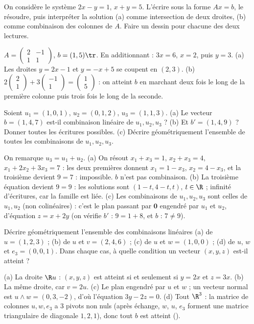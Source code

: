 \begin{exo}
On considère le système $2x-y=1$, $x+y=5$. L'écrire sous la forme $Ax=b$, le résoudre, puis interpréter la solution (a) comme intersection de deux droites, (b) comme combinaison des colonnes de $A$. Faire un dessin pour chacune des deux lectures.
\begin{corrige}
$A=\begin{pmatrix}2&-1\\1&1\end{pmatrix}$, $b=(1,5)\tr$. En additionnant : $3x=6$, $x=2$, puis $y=3$. (a) Les droites $y=2x-1$ et $y=-x+5$ se coupent en $(2,3)$. (b) $2\begin{pmatrix}2\\1\end{pmatrix}+3\begin{pmatrix}-1\\1\end{pmatrix}=\begin{pmatrix}1\\5\end{pmatrix}$ : on atteint $b$ en marchant deux fois le long de la première colonne puis trois fois le long de la seconde.
\end{corrige}
\end{exo}
\begin{exo}
Soient $u_1=(1,0,1)$, $u_2=(0,1,2)$, $u_3=(1,1,3)$. (a) Le vecteur $b=(1,4,7)$ est-il combinaison linéaire de $u_1,u_2,u_3$ ? (b) Et $b'=(1,4,9)$ ? Donner toutes les écritures possibles. (c) Décrire géométriquement l'ensemble de toutes les combinaisons de $u_1,u_2,u_3$.
\begin{corrige}
On remarque $u_3=u_1+u_2$. (a) On résout $x_1+x_3=1$, $x_2+x_3=4$, $x_1+2x_2+3x_3=7$ : les deux premières donnent $x_1=1-x_3$, $x_2=4-x_3$, et la troisième devient $9=7$ : impossible. $b$ n'est pas combinaison. (b) La troisième équation devient $9=9$ : les solutions sont $(1-t,4-t,t)$, $t\in\R$ ; infinité d'écritures, car la famille est liée. (c) Les combinaisons de $u_1,u_2,u_3$ sont celles de $u_1,u_2$ (non colinéaires) : c'est le plan passant par $\mathbf 0$ engendré par $u_1$ et $u_2$, d'équation $z=x+2y$ (on vérifie $b'$ : $9=1+8$, et $b$ : $7\neq9$).
\end{corrige}
\end{exo}
\begin{exo}
Décrire géométriquement l'ensemble des combinaisons linéaires (a) de $u=(1,2,3)$ ; (b) de $u$ et $v=(2,4,6)$ ; (c) de $u$ et $w=(1,0,0)$ ; (d) de $u$, $w$ et $e_3=(0,0,1)$. Dans chaque cas, à quelle condition un vecteur $(x,y,z)$ est-il atteint ?
\begin{corrige}
(a) La droite $\R u$ : $(x,y,z)$ est atteint si et seulement si $y=2x$ et $z=3x$. (b) La même droite, car $v=2u$. (c) Le plan engendré par $u$ et $w$ ; un vecteur normal est $u\wedge w=(0,3,-2)$, d'où l'équation $3y-2z=0$. (d) Tout $\R^3$ : la matrice de colonnes $u,w,e_3$ a $3$ pivots non nuls (après échange, $w$, $u$, $e_3$ forment une matrice triangulaire de diagonale $1,2,1$), donc tout $b$ est atteint ().
\end{corrige}
\end{exo}
